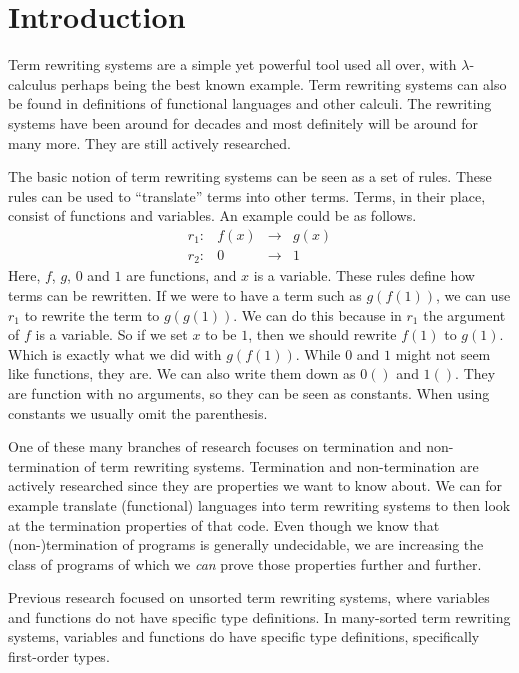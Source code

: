 \chapter{Introduction}\label{introduction}
Term rewriting systems are a simple yet powerful tool used all over, with $\lambda$-calculus perhaps being the best known example. Term rewriting systems can also be found in definitions of functional languages and other calculi. The rewriting systems have been around for decades and most definitely will be around for many more. They are still actively researched. 

The basic notion of term rewriting systems can be seen as a set of rules. These rules can be used to ``translate'' terms into other terms. Terms, in their place, consist of functions and variables. An example could be as follows.
\[
\begin{array}{lrcl}
r_1: & f(x) & \rightarrow & g(x) \\
r_2: & 0 & \rightarrow & 1
\end{array}
\]
Here, $f$, $g$, $0$ and $1$ are functions, and $x$ is a variable. These rules define how terms can be rewritten. If we were to have a term such as $g(f(1))$, we can use $r_1$ to rewrite the term to $g(g(1))$. We can do this because in $r_1$ the argument of $f$ is a variable. So if we set $x$ to be $1$, then we should rewrite $f(1)$ to $g(1)$. Which is exactly what we did with $g(f(1))$. While $0$ and $1$ might not seem like functions, they are. We can also write them down as $0()$ and $1()$. They are function with no arguments, so they can be seen as constants. When using constants we usually omit the parenthesis. 

One of these many branches of research focuses on termination and non-termination of term rewriting systems. Termination and non-termination are actively researched since they are properties we want to know about. We can for example translate (functional) languages into term rewriting systems to then look at the termination properties of that code. Even though we know that (non-)termination of programs is generally undecidable, we are increasing the class of programs of which we \textit{can} prove those properties further and further.

Previous research focused on unsorted term rewriting systems, where variables and functions do not have specific type definitions. In many-sorted term rewriting systems, variables and functions do have specific type definitions, specifically first-order types. 

